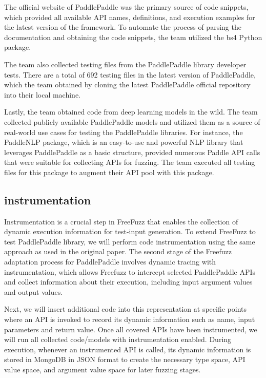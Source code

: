 \documentclass[sigconf]{acmart}
\begin{document}
  \par The official website of PaddlePaddle was the primary source of code snippets, which provided all available API names, 
  definitions, and execution examples for the latest version of the framework. To automate the process of parsing the documentation and obtaining the code snippets, 
  the team utilized the bs4 Python package. 

  \par The team also collected testing files from the PaddlePaddle library developer tests. 
  There are a total of 692 testing files in the latest version of PaddlePaddle, which the team obtained by cloning the latest PaddlePaddle official repository into their local machine.

  \par Lastly, the team obtained code from deep learning models in the wild. 
  The team collected publicly available PaddlePaddle models and utilized them as a source of real-world use cases for testing the PaddlePaddle libraries. 
  For instance, the PaddleNLP package, which is an easy-to-use and powerful NLP library that leverages PaddlePaddle as a basic structure, provided numerous Paddle API calls that were suitable for collecting APIs for fuzzing. 
  The team executed all testing files for this package to augment their API pool with this package.
    
  \subsection{instrumentation}
  

  Instrumentation is a crucial step in FreeFuzz that enables the collection of dynamic execution information for test-input generation. 
  To extend FreeFuzz to test PaddlePaddle library, we will perform code instrumentation using the same approach as used in the original paper.
  The second stage of the Freefuzz adaptation process for PaddlePaddle involves dynamic tracing with instrumentation, 
  which allows Freefuzz to intercept selected PaddlePaddle APIs and collect information about their execution, 
  including input argument values and output values. 

  Next, we will insert additional code into this representation at specific points where an API is invoked to record its dynamic information such as name, input parameters and return value.
  Once all covered APIs have been instrumented, we will run all collected code/models with instrumentation enabled. 
  During execution, whenever an instrumented API is called, its dynamic information is stored in MongoDB in JSON format to create the necessary type space, 
  API value space, and argument value space for later fuzzing stages.
\end{document}
